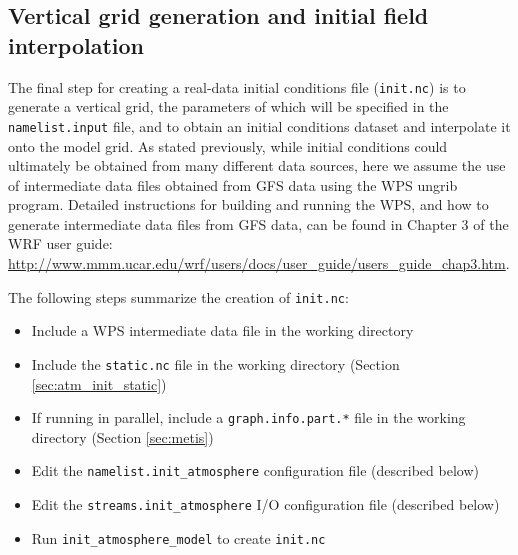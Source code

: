 \subsection{Vertical grid generation and initial field interpolation}
\label{sec:atm_real_met}

The final step for creating a real-data initial conditions file ({\tt init.nc}) is to generate a vertical grid, the parameters of which will be specified in the {\tt namelist.input} file, and to obtain an initial conditions dataset and interpolate it onto the model grid. As stated previously, while initial conditions could ultimately be obtained from many different data sources, here we assume the use of intermediate data files obtained from GFS data using the WPS ungrib program.  Detailed instructions for building and running the WPS, and how to generate intermediate data files from GFS data, can be found in Chapter 3 of the WRF user guide: \\
\url{http://www.mmm.ucar.edu/wrf/users/docs/user\_guide/users\_guide\_chap3.htm}.

The following steps summarize the creation of {\tt init.nc}:

\begin{itemize}
\item Include a WPS intermediate data file in the working directory
\item Include the {\tt static.nc} file in the working directory (Section \ref{sec:atm_init_static})
\item If running in parallel, include a {\tt graph.info.part.*} file in the working directory (Section \ref{sec:metis})
\item Edit the {\tt namelist.init\_atmosphere} configuration file (described below)
\item Edit the {\tt streams.init\_atmosphere} I/O configuration file (described below)
\item Run {\tt init\_atmosphere\_model} to create {\tt init.nc}
\end{itemize}


